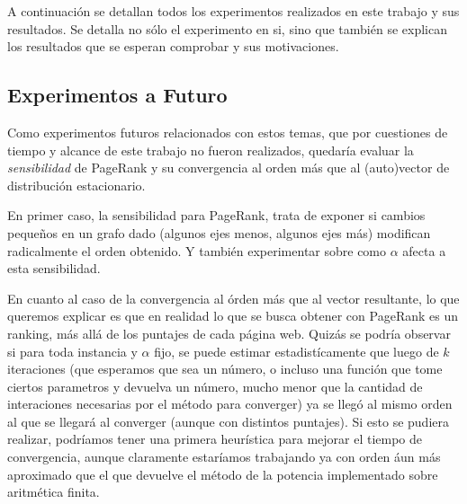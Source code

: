 \par A continuaci\'on se detallan todos los experimentos realizados en este
trabajo y sus resultados. Se detalla no s\'olo el experimento en si, sino que
tambi\'en se explican los resultados que se esperan comprobar y sus
motivaciones.



\newpage


\newpage


\newpage


\newpage


\newpage


\newpage


\newpage


\newpage
\subsection{Experimentos a Futuro}
\par Como experimentos futuros relacionados con estos temas, que por cuestiones
de tiempo y alcance de este trabajo no fueron realizados, quedaría evaluar la
\emph{sensibilidad} de PageRank y su convergencia al orden m\'as que al
(auto)vector de distribuci\'on estacionario.

\par En primer caso, la sensibilidad para PageRank, trata de exponer si cambios
peque\~nos en un grafo dado (algunos ejes menos, algunos ejes m\'as) modifican
radicalmente el orden obtenido. Y tambi\'en experimentar sobre como $\alpha$
afecta a esta sensibilidad.

\par En cuanto al caso de la convergencia al \'orden m\'as que al vector
resultante, lo que queremos explicar es que en realidad lo que se busca obtener
con PageRank es un ranking, m\'as all\'a de los puntajes de cada p\'agina web.
Quizás se podr\'ia observar si para toda instancia y $\alpha$ fijo, se puede
estimar estadist\'icamente que luego de $k$ iteraciones (que esperamos que sea
un n\'umero, o incluso una funci\'on que tome ciertos parametros y devuelva un
n\'umero, mucho menor que la cantidad de interaciones necesarias por el
m\'etodo para converger) ya se lleg\'o al mismo orden al que se llegar\'a al
converger (aunque con distintos puntajes). Si esto se pudiera realizar,
podr\'iamos tener una primera heur\'istica para mejorar el tiempo de
convergencia, aunque claramente estar\'iamos trabajando ya con orden \'aun m\'as
aproximado que el que devuelve el m\'etodo de la potencia implementado sobre
aritm\'etica finita.
